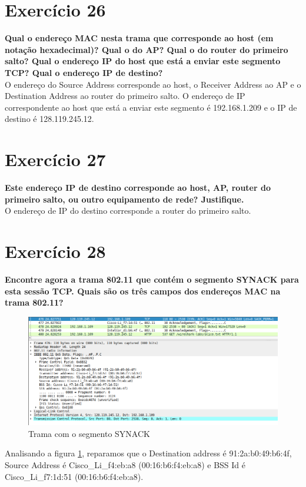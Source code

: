 \documentclass[a4paper]{report}
\begin{document}
\section{Exercício 26}
\textbf{Qual o endereço MAC nesta trama que corresponde ao host (em notação
hexadecimal)? Qual o do AP? Qual o do router do primeiro salto? Qual o
endereço IP do host que está a enviar este segmento TCP? Qual o endereço IP
de destino?}\\
O endereço do Source Address corresponde ao host, o Receiver Address ao AP e o 
Destination Address ao router do primeiro salto. O endereço de IP correspondente
ao host que está a enviar este segmento é 192.168.1.209 e o IP de destino é
128.119.245.12.

\section{Exercício 27}
\textbf{Este endereço IP de destino corresponde ao host, AP, router do primeiro
salto, ou outro equipamento de rede? Justifique.}\\
O endereço de IP do destino corresponde a router do primeiro salto.

\section{Exercício 28}
\textbf{Encontre agora a trama 802.11 que contém o segmento SYNACK para esta
sessão TCP. Quais são os três campos dos endereços MAC na trama 802.11?}\\

\begin{figure}[H]
    \centering 
    \includegraphics[width=\textwidth]{images/tramaEx28.png}  
    \caption{Trama com o segmento SYNACK}
    \label{fig:tramaEx28}
\end{figure}
Analisando a figura \ref{fig:tramaEx28}, reparamos que o Destination address é
91:2a:b0:49:b6:4f, Source Address é Cisco\_Li\_f4:eb:a8 
(00:16:b6:f4:eb:a8) e BSS Id é Cisco\_Li\_f7:1d:51 (00:16:b6:f4:eb:a8).
\end{document}

